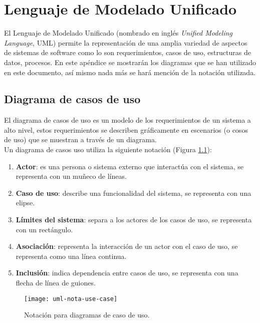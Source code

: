 \chapter{Lenguaje de Modelado Unificado}

El Lenguaje de Modelado Unificado (nombrado en inglés \textit{Unified Modeling Language}, UML) permite la representación de una amplia variedad de aspectos de sistemas de software como lo son requerimientos, casos de uso, estructuras de datos, procesos\cite{UMLClassroom}. En este apéndice se mostrarán los diagramas que se han utilizado en este documento, así mismo nada más se hará mención de la notación utilizada.

\section{Diagrama de casos de uso}\label{sec:uml-cu}
El diagrama de casos de uso es un modelo de los requerimientos de un sistema a alto nivel, estos requerimientos se describen gráficamente en escenarios (o cosos de uso) que se muestran a través de un diagrama\cite{UMLClassroom, SoftwareEngineeringUML}.\\
Un diagrama de casos uso utiliza la siguiente notación\cite{UMLClassroom, SoftwareEngineeringUML} (Figura \ref{fig:uml-nota-use-case}):
\begin{enumerate}
  \item \textbf{Actor}: es una persona o sistema externo que interactúa con el sistema, se representa con un muñeco de líneas.
  \item \textbf{Caso de uso}: describe una funcionalidad del sistema, se representa con una elipse.
  \item \textbf{Límites del sistema}: separa a los actores de los casos de uso, se representa con un rectángulo.
  \item \textbf{Asociación}: representa la interacción de un actor con el caso de uso, se representa como una línea continua.
  \item \textbf{Inclusión}: indica dependencia entre casos de uso, se representa con una flecha de línea de guiones.
\end{enumerate}

\begin{figure}[h]
  \centering
  \texttt{[image: uml-nota-use-case]}
  \caption{Notación para diagramas de caso de uso\cite{SoftwareEngineeringUML}.}
  \label{fig:uml-nota-use-case}
\end{figure}

